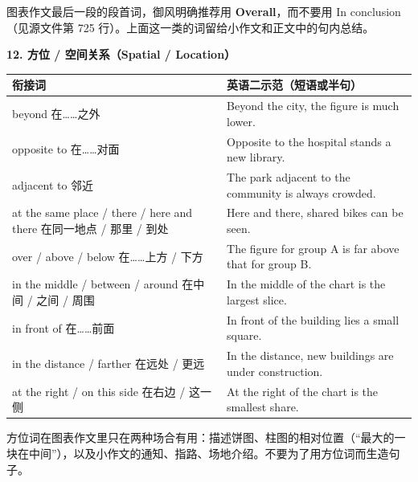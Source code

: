 \documentclass[11pt,a4paper]{ctexart}
\newcommand{\tip}[1]{\par\addvspace{3pt}\noindent{\bfseries【提示】}#1\par\addvspace{3pt}}
\begin{document}
\tip{图表作文最后一段的段首词，御风明确推荐用 \textbf{Overall}，而不要用 In conclusion（见源文件第 725 行）。上面这一类的词留给小作文和正文中的句内总结。}

\par\addvspace{6pt}\noindent\textbf{12. 方位 / 空间关系（Spatial / Location）}\par\addvspace{2pt}
\begin{longtable}{L{5.4cm}L{10.6cm}}
\toprule
\textbf{衔接词} & \textbf{英语二示范（短语或半句）} \\
\midrule
\endhead
beyond 在……之外 & Beyond the city, the figure is much lower. \\
opposite to 在……对面 & Opposite to the hospital stands a new library. \\
adjacent to 邻近 & The park adjacent to the community is always crowded. \\
at the same place / there / here and there 在同一地点 / 那里 / 到处 & Here and there, shared bikes can be seen. \\
over / above / below 在……上方 / 下方 & The figure for group A is far above that for group B. \\
in the middle / between / around 在中间 / 之间 / 周围 & In the middle of the chart is the largest slice. \\
in front of 在……前面 & In front of the building lies a small square. \\
in the distance / farther 在远处 / 更远 & In the distance, new buildings are under construction. \\
at the right / on this side 在右边 / 这一侧 & At the right of the chart is the smallest share. \\
\bottomrule
\end{longtable}

\tip{方位词在图表作文里只在两种场合有用：描述饼图、柱图的相对位置（“最大的一块在中间”），以及小作文的通知、指路、场地介绍。不要为了用方位词而生造句子。}
\end{document}
